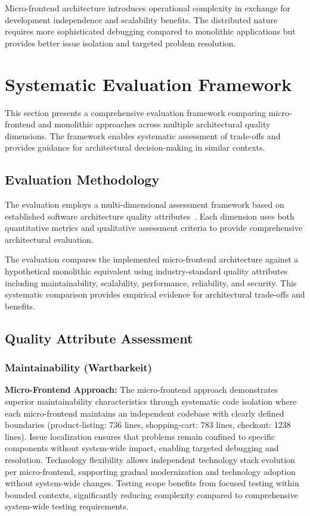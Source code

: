 \documentclass[12pt,a4paper]{report}
\begin{document}
Micro-frontend architecture introduces operational complexity in exchange for development independence and scalability benefits. The distributed nature requires more sophisticated debugging compared to monolithic applications but provides better issue isolation and targeted problem resolution.

\section{Systematic Evaluation Framework}

This section presents a comprehensive evaluation framework comparing micro-frontend and monolithic approaches across multiple architectural quality dimensions. The framework enables systematic assessment of trade-offs and provides guidance for architectural decision-making in similar contexts.

\subsection{Evaluation Methodology}

The evaluation employs a multi-dimensional assessment framework based on established software architecture quality attributes~\cite{bass2012software}. Each dimension uses both quantitative metrics and qualitative assessment criteria to provide comprehensive architectural evaluation.

The evaluation compares the implemented micro-frontend architecture against a hypothetical monolithic equivalent using industry-standard quality attributes including maintainability, scalability, performance, reliability, and security. This systematic comparison provides empirical evidence for architectural trade-offs and benefits.

\subsection{Quality Attribute Assessment}

\subsubsection{Maintainability (Wartbarkeit)}

\textbf{Micro-Frontend Approach:} The micro-frontend approach demonstrates superior maintainability characteristics through systematic code isolation where each micro-frontend maintains an independent codebase with clearly defined boundaries (product-listing: 736 lines, shopping-cart: 783 lines, checkout: 1238 lines). Issue localization ensures that problems remain confined to specific components without system-wide impact, enabling targeted debugging and resolution. Technology flexibility allows independent technology stack evolution per micro-frontend, supporting gradual modernization and technology adoption without system-wide changes. Testing scope benefits from focused testing within bounded contexts, significantly reducing complexity compared to comprehensive system-wide testing requirements.
\end{document}
